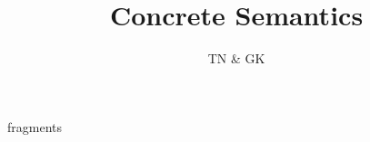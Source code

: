 \documentclass[11pt,a4paper]{article}
\begin{document}
\openisaverbatimout fragments

\title{Concrete Semantics}
\author{TN \& GK}
\maketitle

\setcounter{tocdepth}{2}
\tableofcontents
\newpage



\nocite{Nipkow}



\end{document}
